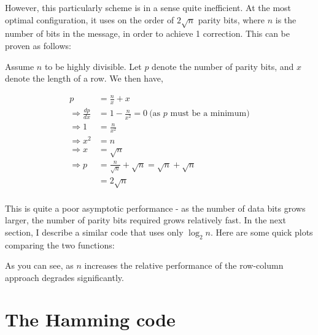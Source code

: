 \documentclass{article}
\begin{document}
    However, this particularly scheme is in a sense quite inefficient. At the
    most optimal configuration, it uses on the order of $2\sqrt{n}$ parity bits,
    where $n$ is the number of bits in the message, in order to achieve 1
    correction. This can be proven as follows:

    Assume $n$ to be highly divisible. Let $p$ denote the number of parity
    bits, and $x$ denote the length of a row. We then have,

    \begin{align*}
        p &= \frac{n}{x} + x \\
        \Rightarrow \frac{dp}{dx} &= 1 - \frac{n}{x^2}
                    = 0\ \text{(as $p$ must be a minimum)}\\
        \Rightarrow 1 &= \frac{n}{x^2} \\
        \Rightarrow x^2 &= n \\
        \Rightarrow x &= \sqrt{n} \\
        \Rightarrow p &= \frac{n}{\sqrt{n}} + \sqrt{n} = \sqrt{n} + \sqrt{n} \\
                      &= 2\sqrt{n} \\
    \end{align*}

    This is quite a poor asymptotic performance - as the number of data bits
    grows larger, the number of parity bits required grows relatively fast. In
    the next section, I describe a similar code that uses only $\log_2 n$. Here
    are some quick plots comparing the two functions:

\begin{center}
\end{center}

    As you can see, as $n$ increases the relative performance of the row-column
    approach degrades significantly.

    \section{The Hamming code}
\end{document}
